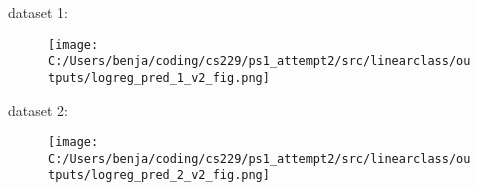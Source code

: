 %
%
	
\begin{answer}

dataset 1:
\begin{figure}[H]
	\texttt{[image: C:/Users/benja/coding/cs229/ps1\_attempt2/src/linearclass/outputs/logreg\_pred\_1\_v2\_fig.png]}
\end{figure}
dataset 2:
\begin{figure}[H]
	\texttt{[image: C:/Users/benja/coding/cs229/ps1\_attempt2/src/linearclass/outputs/logreg\_pred\_2\_v2\_fig.png]}
\end{figure}
\end{answer}

%
